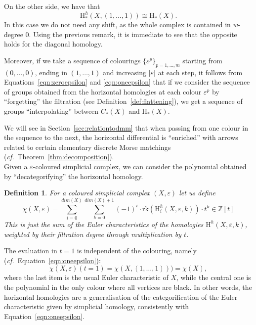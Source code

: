 \documentclass[11pt, a4paper, reqno, twoside, makeidx]{amsart}
\theoremstyle{remark}
\theoremstyle{plain}
\newtheorem{defi}[thm]{Definition}
\theoremstyle{definition}
\newcommand{\Z}{\mathbb{Z}}
\newcommand{\HH}{\mathrm{H}}
\begin{document}
On the other side, we have that 
\begin{equation}\label{eqn:oneepsilon}
\HH^h_*(X,(1,\ldots, 1)) \cong \HH_*(X).
\end{equation} 
In this case we do not need any shift, as the whole complex is contained in $w$-degree $0$. Using the previous remark, it is immediate to see that the opposite holds for the diagonal homology.

Moreover, if we take a sequence of colourings $\{\varepsilon^p\}_{p = 1, \ldots,m}$ starting from $(0,\ldots, 0)$, ending in $(1, \ldots, 1)$ and increasing $|\varepsilon|$ at each step, it follows from Equations~\eqref{eqn:zeroepsilon} and \eqref{eqn:oneepsilon} that if we consider the sequence of groups obtained from the horizontal homologies at each colour $\varepsilon^p$ by ``forgetting'' the filtration (see Definition~\ref{def:flattening}),  we get a sequence of groups  ``interpolating'' between $ C_*(X)$ and  $\HH_*(X)$. 

We will see in Section~\ref{sec:relationtodmm} that when passing from one colour in the sequence to the next, the horizontal differential is ``enriched'' with arrows related to certain elementary discrete Morse matchings (\emph{cf.}~Theorem~\ref{thm:decomposition}).\\






Given a $\varepsilon$-coloured simplicial complex, we can consider the polynomial obtained by ``decategorifying'' the horizontal homology.
\begin{defi}\label{def:decateghoriz}
For a coloured simplicial complex $(X, \varepsilon)$ let us define  $$\chi(X,\varepsilon) = \sum_{i = 0}^{dim(X)} \sum_{k = 0}^{dim(X)+1} (-1)^i \cdot \mathrm{rk}(\HH^h_i(X, \varepsilon,k)) \cdot t^k \in \Z [t]$$
This is just the sum of the Euler characteristics of the homologies $\HH^h(X, \varepsilon,k)$, weighted by their filtration degree through multiplication by $t$.
\end{defi}


The evaluation in $t = 1$ is independent of the colouring, namely (\emph{cf.}~Equation~\eqref{eqn:oneepsilon}):
\begin{equation*}
\chi(X, \varepsilon)(t = 1) = \chi(X, (1, \ldots,1))) = \chi(X),
\end{equation*}
where the last item is the usual Euler characteristic of $X$, while the central one is the polynomial in the only colour where all vertices are black. In other words, the horizontal homologies are a generalisation of the categorification of the Euler characteristic given by simplicial homology, consistently with Equation~\eqref{eqn:oneepsilon}.
\end{document}
